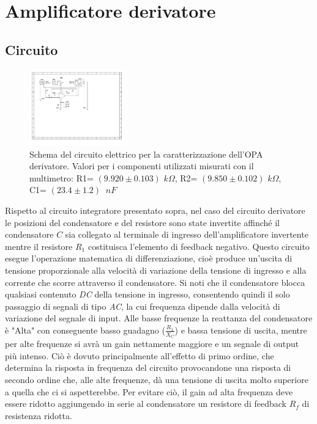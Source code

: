\documentclass[journal]{IEEEtran}
\begin{document}
\section{\textbf{Amplificatore derivatore}} %
\subsection{\textbf{Circuito}}
\begin{figure}[H]%
\begin{center}
\includegraphics[width=0.38\textwidth]{sch-simulations/output/OPA-deriv.pdf}
\caption{Schema  del  circuito  elettrico  per  la  caratterizzazione  dell’OPA derivatore.  Valori  per  i  componenti  utilizzati  misurati  con  il  multimetro: R1= $(9.920 \pm 0.103)$ $k\Omega$, R2= $(9.850 \pm 0.102)$ $k\Omega$, C1= $(23.4 \pm 1.2)$ $\ nF$}
\label{fig:OPA-deriv}
\end{center}
\end{figure}
Rispetto al circuito integratore presentato sopra, nel caso del circuito derivatore le posizioni del condensatore e del resistore sono state invertite affinché il condensatore $C$ sia collegato al terminale di ingresso dell'amplificatore invertente mentre il resistore $R_1$ costituisca l'elemento di feedback negativo. Questo circuito esegue l'operazione matematica di differenziazione, cioè produce un'uscita di tensione proporzionale alla velocità di variazione della tensione di ingresso e alla corrente che scorre attraverso il condensatore. Si noti che il condensatore blocca qualsiasi contenuto \textit{DC} della tensione in ingresso, consentendo  quindi il solo passaggio di segnali di tipo \textit{AC}, la cui frequenza dipende dalla velocità di variazione del segnale di input. Alle basse frequenze la reattanza del condensatore è "Alta" con conseguente basso guadagno ($\frac{R_1}{X_C}$) e bassa tensione di uscita, mentre per alte frequenze si avrà un gain nettamente maggiore e un segnale di output più intenso. Ciò è dovuto principalmente all'effetto di primo ordine, che determina la risposta in frequenza del circuito provocandone una risposta di secondo ordine che, alle alte frequenze, dà una tensione di uscita molto superiore a quella che ci si aspetterebbe. Per evitare ciò, il gain ad alta frequenza deve essere ridotto aggiungendo in serie al condensatore un resistore di feedback $R_f$ di resistenza ridotta. 
\end{document}
